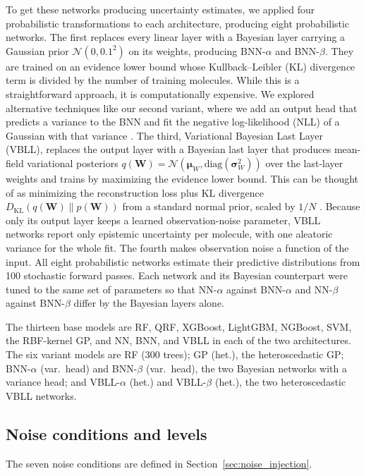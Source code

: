 To get these networks producing uncertainty estimates, we applied four probabilistic transformations to each architecture, producing eight probabilistic networks. The first replaces every linear layer with a Bayesian layer carrying a Gaussian prior $\mathcal{N}(0, 0.1^2)$ on its weights, producing BNN-$\alpha$ and BNN-$\beta$. They are trained on an evidence lower bound whose Kullback--Leibler (KL) divergence term is divided by the number of training molecules. While this is a straightforward approach, it is computationally expensive. We explored alternative techniques like our second variant, where we add an output head that predicts a variance to the BNN and fit the negative log-likelihood (NLL) of a Gaussian with that variance \citep{kendall2017}. The third, Variational Bayesian Last Layer (VBLL), replaces the output layer with a Bayesian last layer that produces mean-field variational posteriors $q(\mathbf{W}) = \mathcal{N}(\boldsymbol{\mu}_W, \text{diag}(\boldsymbol{\sigma}_W^2))$ over the last-layer weights and trains by maximizing the evidence lower bound. This can be thought of as minimizing the reconstruction loss plus KL divergence $D_{\text{KL}}(q(\mathbf{W}) \| p(\mathbf{W}))$ from a standard normal prior, scaled by $1/N$ \citep{Harrison2024}. Because only its output layer keeps a learned observation-noise parameter, VBLL networks report only epistemic uncertainty per molecule, with one aleatoric variance for the whole fit. The fourth makes observation noise a function of the input. All eight probabilistic networks estimate their predictive distributions from 100 stochastic forward passes. Each network and its Bayesian counterpart were tuned to the same set of parameters so that NN-$\alpha$ against BNN-$\alpha$ and NN-$\beta$ against BNN-$\beta$ differ by the Bayesian layers alone. 

The thirteen base models are RF, QRF, XGBoost, LightGBM, NGBoost, SVM, the RBF-kernel GP, and NN, BNN, and VBLL in each of the two architectures. The six variant models are RF (300 trees); GP (het.), the heteroscedastic GP; BNN-$\alpha$ (var.\ head) and BNN-$\beta$ (var.\ head), the two Bayesian networks with a variance head; and VBLL-$\alpha$ (het.) and VBLL-$\beta$ (het.), the two heteroscedastic VBLL networks.

\subsection{Noise conditions and levels}

The seven noise conditions are defined in Section~\ref{sec:noise_injection}.

